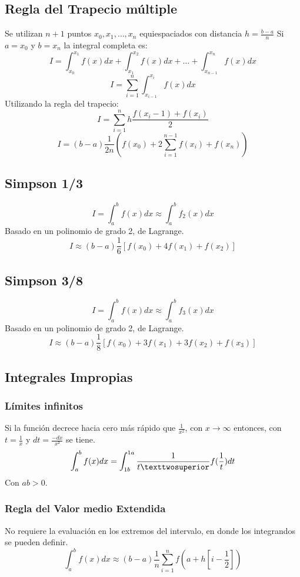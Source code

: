  	\subsection{Regla del Trapecio múltiple}
    Se utilizan $ n +1  $ puntos  $ x_0, x_1, \ldots, x_n$ equiespaciados con distancia $ h = \frac{b-a}{n}$
    Si $a = x_0 $ y $b= x_n $ la integral completa es: 
    	$$I = \int_{x_0}^{x_1} f(x)dx + \int_{x_1}^{x_2} f(x)dx + \ldots +  \int_{x_{n-1}}^{x_{n}} f(x)dx $$ 
        $$ I = \sum_{i=1}^{n} \int_{x_{i-1}}^{x_i} f(x)dx  $$ 
        Utilizando la regla del trapecio: 
        $$
        	I = \sum_{i=1}^{n} h\frac{f(x_i -1) + f(x_i)}{2}
        $$
        $$
        	I = (b-a) \frac{1}{2n} \left( f(x_0) + 2\sum_{i=1}^{n-1} f(x_i) + f(x_n)\right)
        $$
        
        
        \begin{multicols}{2}
        	\subsection{Simpson 1/3}
            $$I = \int_a^b f(x)dx \approx \int_a^b f_2(x)dx $$
            Basado en un polinomio de grado 2, de Lagrange.
           $$ I \approx (b-a)\frac{1}{6} [ f(x_0) + 4f(x_1) +f(x_2)]$$
           
           \subsection{Simpson 3/8}
            $$I = \int_a^b f(x)dx \approx \int_a^b f_3(x)dx $$
            Basado en un polinomio de grado 2, de Lagrange.
           $$ I \approx (b-a)\frac{1}{8} [ f(x_0) + 3f(x_1)+ 3f(x_2)+ f(x_3)]$$
           \subsection{Integrales Impropias}
           \subsubsection{Límites infinitos}
           	Si la función decrece hacia cero más rápido que  $ \frac{1}{x^2}$, con $ x \rightarrow \infty$ entonces, con $  t =  \frac{1}{x} $ y $ dt = \frac{-dx}{x²}$ se tiene.
            $$
            \int_a^b f(x)dx = \int_{1\/b}^{1\/a} \frac{1}{t²}f(\frac{1}{t})dt
            $$
            Con $ab>0$.
           \subsubsection{Regla del Valor medio Extendida}
           No requiere la evaluación en los extremos del intervalo, en donde los integrandos se  pueden definir.
           $$
           \int_a^b f(x)dx \approx (b-a)\frac{1}{n} \sum_{i=1}^n f(a + h[i - \frac{1}{2}])
           $$

\end{multicols}
